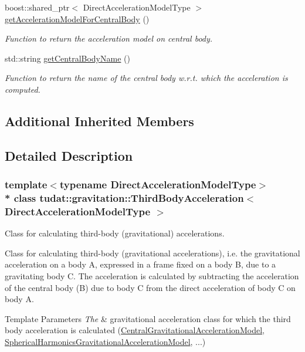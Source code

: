 \begin{DoxyCompactItemize}
boost\+::shared\+\_\+ptr$<$ Direct\+Acceleration\+Model\+Type $>$ \hyperlink{classtudat_1_1gravitation_1_1ThirdBodyAcceleration_aacafa284240b01e2ee73341fb2d3ae51}{get\+Acceleration\+Model\+For\+Central\+Body} ()
\begin{DoxyCompactList}\small\item\em Function to return the acceleration model on central body. \end{DoxyCompactList}\item 
std\+::string \hyperlink{classtudat_1_1gravitation_1_1ThirdBodyAcceleration_a8c552118578291609f8484b3a0de24f2}{get\+Central\+Body\+Name} ()
\begin{DoxyCompactList}\small\item\em Function to return the name of the central body w.\+r.\+t. which the acceleration is computed. \end{DoxyCompactList}\end{DoxyCompactItemize}
\subsection*{Additional Inherited Members}


\subsection{Detailed Description}
\subsubsection*{template$<$typename Direct\+Acceleration\+Model\+Type$>$\\*
class tudat\+::gravitation\+::\+Third\+Body\+Acceleration$<$ Direct\+Acceleration\+Model\+Type $>$}

Class for calculating third-\/body (gravitational) accelerations. 

Class for calculating third-\/body (gravitational accelerations), i.\+e. the gravitational acceleration on a body A, expressed in a frame fixed on a body B, due to a gravitating body C. The acceleration is calculated by subtracting the acceleration of the central body (B) due to body C from the direct acceleration of body C on body A. 
\begin{DoxyTemplParams}{Template Parameters}
{\em The} & gravitational acceleration class for which the third body acceleration is calculated (\hyperlink{classtudat_1_1gravitation_1_1CentralGravitationalAccelerationModel}{Central\+Gravitational\+Acceleration\+Model}, \hyperlink{classtudat_1_1gravitation_1_1SphericalHarmonicsGravitationalAccelerationModel}{Spherical\+Harmonics\+Gravitational\+Acceleration\+Model}, ...) \\
\hline
\end{DoxyTemplParams}


